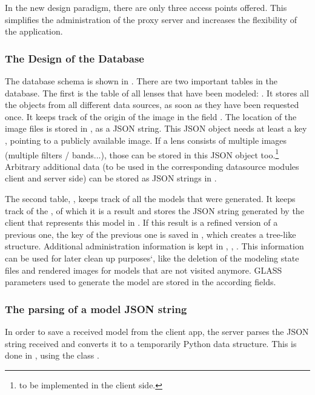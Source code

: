 In the new design paradigm, there are only three access points offered. This simplifies the administration of the proxy server and increases the flexibility of the application.




\subsubsection{The Design of the Database}



The database schema is shown in .
There are two important tables in the database.
The first is the table of all lenses that have been modeled: .
It stores all the objects from all different data sources, as soon as they have been requested once.
It keeps track of the origin of the image in the field .
The location of the image files is stored in , as a JSON string.
This JSON object needs at least a key , pointing to a publicly available image.
If a lens consists of multiple images (multiple filters / bands...), those can be stored in this JSON object too.\footnote{to be implemented in the client side.}
Arbitrary additional data (to be used in the corresponding datasource modules client and server side) can be stored as JSON strings in .

The second table, , keeps track of all the models that were generated.
It keeps track of the , of which it is a result and stores the JSON string generated by the client that represents this model in .
If this result is a refined version of a previous one, the key of the previous one is saved in , which creates a tree-like structure.
Additional administration information is kept in , , .
This information can be used for later clean up purposes`, like the deletion of the modeling state files and rendered images for models that are not visited anymore.
GLASS parameters used to generate the model are stored in the according fields.


\subsubsection{The parsing of a model JSON string}

In order to save a received model from the client app, the server parses the JSON string received and converts it to a temporarily Python data structure.
This is done in , using the class .

